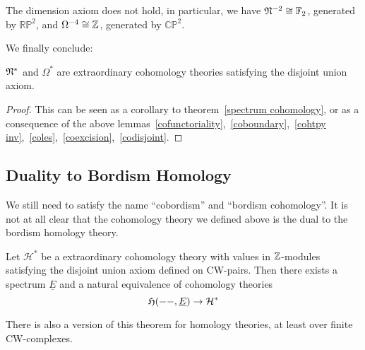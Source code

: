 \documentclass[a4paper,12pt]{article}
\begin{document}
\begin{remark}\cite{thom}
    The dimension axiom does not hold, in particular, we have \(\mathfrak{N}^{-2}\cong\mathbb{F}_2\), generated by \(\mathbb{RP}^2\), and \(\Omega^{-4}\cong\mathbb{Z}\), generated by \(\mathbb{CP}^2\).
\end{remark}


We finally conclude:
\begin{theorem}
    \(\mathfrak{N}^\ast\) and \(\Omega^\ast\) are extraordinary cohomology theories satisfying the disjoint union axiom.
\end{theorem}

\begin{proof}
    This can be seen as a corollary to theorem\ \ref{spectrum cohomology}, or as a consequence of the above lemmas\ \ref{cofunctoriality},\ \ref{coboundary},\ \ref{cohtpy inv},\ \ref{coles},\ \ref{coexcision},\ \ref{codisjoint}.
\end{proof}

\subsection{Duality to Bordism Homology}

We still need to satisfy the name \enquote{cobordism} and \enquote{bordism cohomology}. It is not at all clear that the cohomology theory we defined above is the dual to the bordism homology theory.

\begin{theorem}%
    Let \(\mathcal{H}^\ast\) be a extraordinary cohomology theory with values in \(\mathbb{Z}\)-modules satisfying the disjoint union axiom defined on CW-pairs. Then there exists a spectrum \(\underline E\) and a natural equivalence of cohomology theories
    \[\mathfrak{H}(--,\underline{E})\to\mathcal{H}^\ast\]
\end{theorem}

\begin{remark}
    There is also a version of this theorem for homology theories, at least over finite CW-complexes.
\end{remark}
\end{document}
